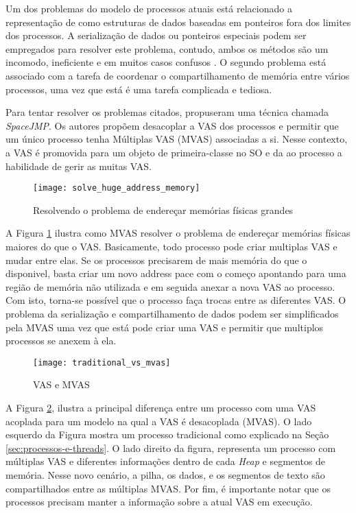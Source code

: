 Um dos problemas do modelo de processos atuais está relacionado a representação
de como estruturas de dados baseadas em ponteiros fora dos limites dos
processos. A serialização de dados ou ponteiros especiais podem ser empregados
para resolver este problema, contudo, ambos os métodos são um incomodo,
ineficiente e em muitos casos confusos \cite{spacejmp}. O segundo problema está
associado com a tarefa de coordenar o compartilhamento de memória entre
vários processos, uma vez que está é uma tarefa complicada e tediosa.

Para tentar resolver os problemas citados, \cite{spacejmp} propuseram uma
técnica chamada \emph{SpaceJMP}. Os autores propõem desacoplar a VAS dos
processos e permitir que um único processo tenha Múltiplas VAS (MVAS)
associadas a si. Nesse contexto, a VAS é promovida para um objeto de
primeira-classe no SO e da ao processo a habilidade de gerir as muitas
VAS.

\begin{figure}[!h]
  \centering
  \texttt{[image: solve\_huge\_address\_memory]}
  \caption{Resolvendo o problema de endereçar memórias físicas grandes}
  \label{fig:large_memory}
\end{figure}

A Figura \ref{fig:large_memory} ilustra como MVAS resolver o problema de
endereçar memórias físicas maiores do que o VAS. Basicamente, todo processo
pode criar multiplas VAS e mudar entre elas. Se os processos precisarem de mais
memória do que o disponivel, basta criar um novo address pace com o começo
apontando para uma região de memória não utilizada e em seguida anexar a nova
VAS ao processo. Com isto, torna-se possível que o processo faça trocas entre
as diferentes VAS. O problema da serialização e compartilhamento de dados podem
ser simplificados pela MVAS uma vez que está pode criar uma VAS e permitir que
multiplos processos se anexem à ela.

\begin{figure}[!h]
  \centering
  \texttt{[image: traditional\_vs\_mvas]} 
  \caption{VAS e MVAS \citep{spacejmp}}
  \label{fig:traditional_vs_mvas} 
\end{figure}

A Figura \ref{fig:traditional_vs_mvas}, ilustra a principal diferença entre um
processo com uma VAS acoplada para um modelo na qual a VAS é desacoplada
(MVAS). O lado esquerdo da Figura mostra um processo tradicional como explicado
na Seção \ref{sec:processos-e-threads}. O lado direito da figura, representa um
processo com múltiplas VAS e diferentes informações dentro de cada \emph{Heap}
e segmentos de memória. Nesse novo cenário, a pilha, os dados, e os segmentos
de texto são compartilhados entre as múltiplas MVAS. Por fim, é importante
notar que os processos precisam manter a informação sobre a atual VAS em
execução.
 
